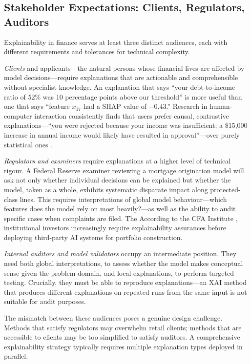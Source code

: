\subsection{Stakeholder Expectations: Clients, Regulators, Auditors}
\label{sec:ch12-stakeholder-expectations}

Explainability in finance serves at least three distinct audiences, each with different
requirements and tolerances for technical complexity.

\emph{Clients} and applicants---the natural persons whose financial lives are affected
by model decisions---require explanations that are actionable and comprehensible without
specialist knowledge. An explanation that says ``your debt-to-income ratio of 52\% was
10 percentage points above our threshold'' is more useful than one that says ``feature
$x_{17}$ had a SHAP value of $-0.43$.'' Research in human-computer interaction
consistently finds that users prefer causal, contrastive explanations---``you were
rejected because your income was insufficient; a \$15,000 increase in annual income
would likely have resulted in approval''---over purely statistical ones
\cite{miller2019explanation}.

\emph{Regulators and examiners} require explanations at a higher level of technical
rigour. A Federal Reserve examiner reviewing a mortgage origination model will ask not
only whether individual decisions can be explained but whether the model, taken as a whole,
exhibits systematic disparate impact along protected-class lines. This requires
interpretations of global model behaviour---which features does the model rely on most
heavily?---as well as the ability to audit specific cases when complaints are filed. The
According to the CFA Institute \cite{cfainstitute2025xai}, institutional investors increasingly require explainability assurances before
deploying third-party AI systems for portfolio construction.

\emph{Internal auditors and model validators} occupy an intermediate position. They need
both global interpretations, to assess whether the model makes conceptual sense given the
problem domain, and local explanations, to perform targeted testing. Crucially, they must
be able to reproduce explanations---an XAI method that produces different explanations on
repeated runs from the same input is not suitable for audit purposes.

The mismatch between these audiences poses a genuine design challenge. Methods that
satisfy regulators may overwhelm retail clients; methods that are accessible to clients
may be too simplified to satisfy auditors. A comprehensive explainability strategy
typically requires multiple explanation types deployed in parallel.

